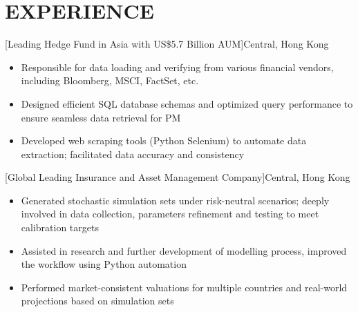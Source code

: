 \documentclass[cmu]{resume}
\begin{document}
    \section{EXPERIENCE}
    [Leading Hedge Fund in Asia with US\$5.7 Billion AUM]{Central, Hong Kong}
    \begin{itemize}
        \item Responsible for data loading and verifying from various financial vendors, including Bloomberg, MSCI, FactSet, etc.
        \item Designed efficient SQL database schemas and optimized query performance to ensure seamless data retrieval for PM
        \item Developed web scraping tools (Python Selenium) to automate data extraction; facilitated data accuracy and consistency
    \end{itemize}

    [Global Leading Insurance and Asset Management Company]{Central, Hong Kong}
    \begin{itemize}
        \item Generated stochastic simulation sets under risk-neutral scenarios; deeply involved in data collection, parameters refinement and testing to meet calibration targets
        \item Assisted in research and further development of modelling process, improved the workflow using Python automation
        \item Performed market-consistent valuations for multiple countries and real-world projections based on simulation sets
    \end{itemize}
\end{document}
